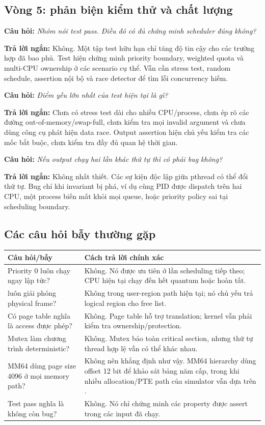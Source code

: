 \documentclass[12pt,a4paper]{article}
\newcommand{\code}[1]{\texttt{\detokenize{#1}}}
\newcommand{\question}[1]{\textbf{\color{bkgold}Câu hỏi:} \textit{#1}}
\newcommand{\answer}{\textbf{\color{bkblue}Trả lời ngắn:} }
\begin{document}
\subsection{Vòng 5: phản biện kiểm thử và chất lượng}

\question{Nhóm nói test pass. Điều đó có đủ chứng minh scheduler đúng không?}

\answer Không. Một tập test hữu hạn chỉ tăng độ tin cậy cho các trường hợp đã
bao phủ. Test hiện chứng minh priority boundary, weighted quota và multi-CPU
ownership ở các scenario cụ thể. Vẫn cần stress test, random schedule,
assertion nội bộ và race detector để tìm lỗi concurrency hiếm.

\question{Điểm yếu lớn nhất của test hiện tại là gì?}

\answer Chưa có stress test dài cho nhiều CPU/process, chưa ép rõ các đường
out-of-memory/swap-full, chưa kiểm tra mọi invalid argument và chưa dùng công
cụ phát hiện data race. Output assertion hiện chủ yếu kiểm tra các mốc bắt
buộc, chưa kiểm tra đầy đủ quan hệ thời gian.

\question{Nếu output chạy hai lần khác thứ tự thì có phải bug không?}

\answer Không nhất thiết. Các sự kiện độc lập giữa pthread có thể đổi thứ tự.
Bug chỉ khi invariant bị phá, ví dụ cùng PID được dispatch trên hai CPU, một
process biến mất khỏi mọi queue, hoặc priority policy sai tại scheduling
boundary.

\subsection{Các câu hỏi bẫy thường gặp}

\begin{longtable}{|p{5.3cm}|p{8.7cm}|}
\hline
\textbf{Câu hỏi/bẫy} & \textbf{Cách trả lời chính xác}\\ \hline
Priority 0 luôn chạy ngay lập tức? & Không. Nó được ưu tiên ở lần scheduling
tiếp theo; CPU hiện tại chạy đến hết quantum hoặc hoàn tất.\\ \hline
\code{FREE} luôn giải phóng physical frame? & Không trong user-region path
hiện tại; nó chủ yếu trả logical region cho free list.\\ \hline
Có page table nghĩa là access được phép? & Không. Page table hỗ trợ
translation; kernel vẫn phải kiểm tra ownership/protection.\\ \hline
Mutex làm chương trình deterministic? & Không. Mutex bảo toàn critical
section, nhưng thứ tự thread hợp lệ vẫn có thể khác nhau.\\ \hline
MM64 dùng page size 4096 ở mọi memory path? & Không nên khẳng định như vậy.
MM64 hierarchy dùng offset 12 bit để khảo sát bảng năm cấp, trong khi nhiều
allocation/PTE path của simulator vẫn dựa trên \code{PAGING_PAGESZ=256}.\\
\hline
Test pass nghĩa là không còn bug? & Không. Nó chỉ chứng minh các property được
assert trong các input đã chạy.\\ \hline
\end{longtable}
\end{document}
